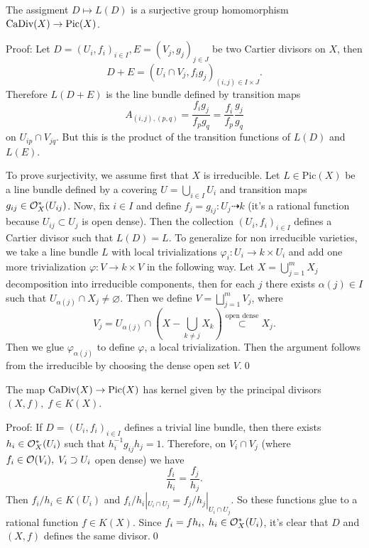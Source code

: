 \begin{dang}
    \begin{proposition}
        The assigment $D\mapsto L(D)$ is a surjective group homomorphism $\text{CaDiv}(X)\to \text{Pic}(X)$. 
    \end{proposition}
\end{dang}
Proof: Let $D=(U_i, f_i)_{i\in I}, E = (V_j, g_j)_{j\in J}$ be two Cartier divisors on $X$, then 
\begin{equation}
    D + E = (U_i\cap V_j, f_ig_j)_{(i,j)\in I\times J}.
\end{equation}
Therefore $L(D+E)$ is the line bundle defined by transition maps 
\begin{equation}
    A_{(i,j), (p,q)} = \frac{f_ig_j}{f_pg_q} = \frac{f_i}{f_p}\frac{g_j}{g_q}
\end{equation}
on $U_{ip}\cap V_{jq}$. But this is the product of the transition functions of $L(D)$ and $L(E)$.\par 

To prove surjectivity, we assume first that $X$ is irreducible. Let $L\in \text{Pic}(X)$ be a line bundle 
defined by a covering $U=\bigcup_{i\in I} U_i$ and transition maps $g_{ij}\in\mathcal{O}_X^*(U_{ij})$. Now, fix $i\in I$ 
and define $f_j = g_{ij}: U_j\dashrightarrow k$ (it's a rational function because $U_{ij}\subset U_j$ is open dense).
Then the collection $(U_i, f_i)_{i \in I}$ defines a Cartier divisor such that $L(D)=L$. To generalize for 
non irreducible varieties, we take a line bundle $L$ with local trivializations $\varphi_i: U_i\to k\times U_i$ 
and add one more trivialization $\varphi: V\to k\times V$ in the following way. Let 
$X=\bigcup_{j=1}^m X_j$ decomposition into irreducible components, then for each $j$ there exists 
$\alpha(j)\in I$ such that $U_{\alpha(j)}\cap X_j\neq\varnothing$. Then we define $V=\bigsqcup_{j=1}^m V_j$, where 
\begin{equation}
    V_j = U_{\alpha(j)}\cap (X-\bigcup_{k\neq j}X_k)\overset{\text{open dense}}{\subset} X_j.
\end{equation}  
Then we glue $\varphi_{\alpha(j)}$ to define $\varphi$, a local trivialization. 
Then the argument follows from the irreducible by choosing the dense open set $V$.\qed
\begin{dang}
    \begin{proposition}
        The map $\text{CaDiv}(X)\to\text{Pic}(X)$ has kernel given by the principal divisors 
        $(X,f),\;f\in K(X)$.
    \end{proposition}
\end{dang}
Proof: If $D=(U_i, f_i)_{i\in I}$ defines a trivial line bundle, then there exists 
$h_i\in\mathcal{O}_X^*(U_i)$ such that $h_i^{-1}g_{ij}h_j=1$. Therefore, on $V_i\cap V_j$ 
(where $f_i\in\mathcal{O}(V_i),\;V_i\supset U_i$ open dense) we have  
\begin{equation}
    \frac{f_i}{h_i} = \frac{f_j}{h_j}. 
\end{equation} 
Then $f_i/h_i \in K(U_i)$ and $f_i/h_i |_{U_i\cap U_j}= f_j/h_j |_{U_i\cap U_j}$. So these functions glue to 
a rational function $f\in K(X)$. Since $f_i = fh_i,\;h_i\in\mathcal{O}_X^*(U_i)$, it's clear that 
$D$ and $(X,f)$ defines the same divisor.\qed

